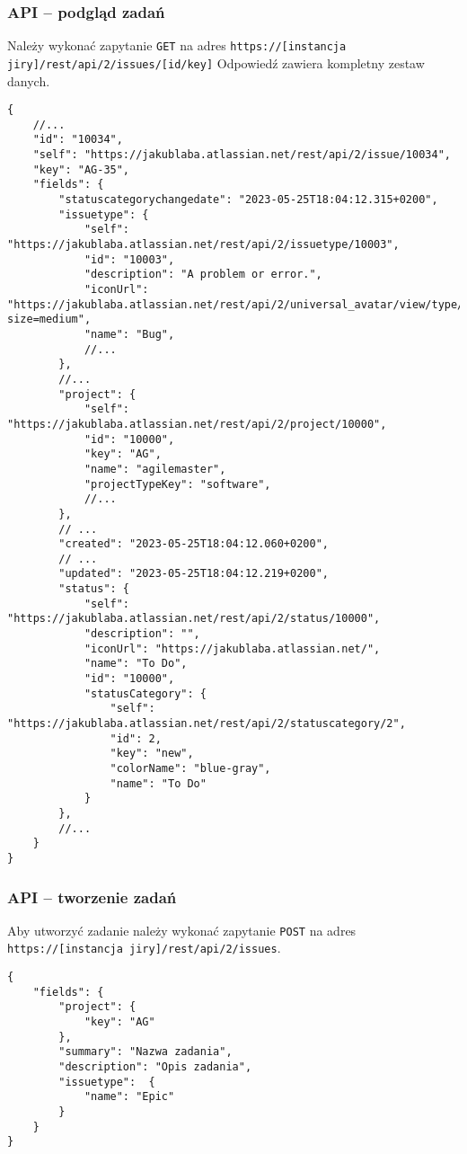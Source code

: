 \subsubsection*{API -- podgląd zadań}
Należy wykonać zapytanie \texttt{GET} na adres \texttt{https://[instancja jiry]/rest/api/2/issues/[id/key]}
Odpowiedź zawiera kompletny zestaw danych.
\begin{lstlisting}[caption=Wybrane dane z zapytania o pojedyncze zadanie (Jira)]
{
    //...
    "id": "10034",
    "self": "https://jakublaba.atlassian.net/rest/api/2/issue/10034",
    "key": "AG-35",
    "fields": {
        "statuscategorychangedate": "2023-05-25T18:04:12.315+0200",
        "issuetype": {
            "self": "https://jakublaba.atlassian.net/rest/api/2/issuetype/10003",
            "id": "10003",
            "description": "A problem or error.",
            "iconUrl": "https://jakublaba.atlassian.net/rest/api/2/universal_avatar/view/type/issuetype/avatar/10303?size=medium",
            "name": "Bug",
            //...
        },
        //...
        "project": {
            "self": "https://jakublaba.atlassian.net/rest/api/2/project/10000",
            "id": "10000",
            "key": "AG",
            "name": "agilemaster",
            "projectTypeKey": "software",
            //...
        },
        // ...
        "created": "2023-05-25T18:04:12.060+0200",
        // ...
        "updated": "2023-05-25T18:04:12.219+0200",
        "status": {
            "self": "https://jakublaba.atlassian.net/rest/api/2/status/10000",
            "description": "",
            "iconUrl": "https://jakublaba.atlassian.net/",
            "name": "To Do",
            "id": "10000",
            "statusCategory": {
                "self": "https://jakublaba.atlassian.net/rest/api/2/statuscategory/2",
                "id": 2,
                "key": "new",
                "colorName": "blue-gray",
                "name": "To Do"
            }
        },
        //...
    }
}
\end{lstlisting}
\subsubsection*{API -- tworzenie zadań}
Aby utworzyć zadanie należy wykonać zapytanie \texttt{POST} na adres \texttt{https://[instancja jiry]/rest/api/2/issues}.
\begin{lstlisting}[caption=Przykładowe zapytanie do stworzenia zadania (Jira)]
{
    "fields": {
        "project": {
            "key": "AG"
        },
        "summary": "Nazwa zadania",
        "description": "Opis zadania",
        "issuetype":  {
            "name": "Epic"
        }
    }
}
\end{lstlisting}

